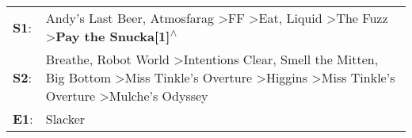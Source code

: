 \begin{supertabular}{p{0.03\textwidth}p{0.92\textwidth}}
 \textbf{S1}:  &                                                                                                                        Andy's Last Beer\textsuperscript{}, \enspace Atmosfarag\textsuperscript{} \textgreater \enspace FF\textsuperscript{} \textgreater \enspace Eat\textsuperscript{}, \enspace Liquid\textsuperscript{} \textgreater \enspace The Fuzz\textsuperscript{} \textgreater \enspace \textbf{Pay the Snucka[1]\textsuperscript{$\wedge$}}  \enspace  \\
 \textbf{S2}:  &  Breathe\textsuperscript{}, \enspace Robot World\textsuperscript{} \textgreater \enspace Intentions Clear\textsuperscript{}, \enspace Smell the Mitten\textsuperscript{}, \enspace Big Bottom\textsuperscript{} \textgreater \enspace Miss Tinkle's Overture\textsuperscript{} \textgreater \enspace Higgins\textsuperscript{} \textgreater \enspace Miss Tinkle's Overture\textsuperscript{} \textgreater \enspace Mulche's Odyssey\textsuperscript{}  \enspace  \\
 \textbf{E1}:  &                                                                                                                                                                                                                                                                                                                                                                                                                              Slacker\textsuperscript{}  \enspace  \\
\end{supertabular}
